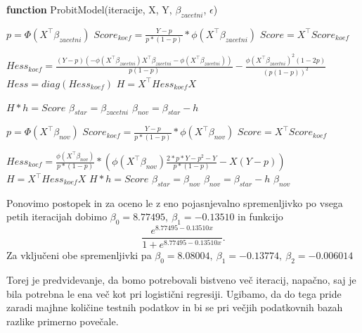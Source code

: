 \documentclass[12pt,a4paper]{amsart}
\theoremstyle{definition} %
\theoremstyle{plain} %
\begin{document}
\begin{algorithm}[H]
    \caption{\textbf{function} ProbitModel(iteracije, X, Y, $\beta_{zacetni}$, $\epsilon$)}
\begin{algorithmic}

    \STATE $p = \Phi(X^\top \beta_{zacetni})$
    \STATE $Score_{koef} = \frac{Y-p}{p*(1-p)} * \phi(X^\top \beta_{zacetni})$
    \STATE $Score = X^\top Score_{koef}$

    \STATE $Hess_{koef} =\frac{(Y-p)(-\phi(X^\top \beta_{zacetni})X^\top \beta_{zacetni} - \phi(X^\top \beta_{zacetni}))}{p(1-p)} - \frac{\phi(X^\top \beta_{zacetni})^2(1-2p)}{(p(1-p))^2}$
    \STATE $Hess = diag(Hess_{koef})$
    \STATE $H = X^\top Hess_{koef} X$
        
    \STATE {} $H * h = Score$
    \STATE $\beta_{star} = \beta_{zacetni}$
    \STATE $\beta_{nov} = \beta_{star} - h$
        
            \STATE $p = \Phi(X^\top \beta_{nov})$
            \STATE $Score_{koef} = \frac{Y-p}{p*(1-p)} * \phi(X^\top \beta_{nov})$
            \STATE $Score = X^\top Score_{koef}$
            
            \STATE $Hess_{koef} = \frac{\phi(X^\top \beta_{nov})}{p*(1-p)} * \left(\phi(X^\top \beta_{nov})\frac{2*p*Y - p^2-Y}{p*(1-p)} - X(Y - p)\right)$
            \STATE $H = X^\top Hess_{koef} X$
            \STATE {}
            \STATE $H * h = Score$ 
            \STATE $\beta_{star} = \beta_{nov}$ 
            \STATE $\beta_{nov} = \beta_{star} - h$ 
        \ELSE
        \STATE {}
        \RETURN $\beta_{nov}$
        \ENDIF
        
    \ENDWHILE
\end{algorithmic}
\end{algorithm}
Ponovimo postopek in za oceno le z eno pojasnjevalno spremenljivko po vsega petih iteracijah dobimo $\beta_{0} = 8.77495,~\beta_{1} = -0.13510$ in funkcijo
\[
    \frac{e^{8.77495-0.13510x}}{1+e^{8.77495-0.13510x}}.
\]
Za vključeni obe spremenljivki pa $\beta_{0} = 8.08004,~\beta_{1} = -0.13774,~\beta_{2} = -0.006014$

Torej je predvidevanje, da bomo potrebovali bistveno več iteracij, napačno, saj je bila potrebna le ena več kot pri logistični regresiji. Ugibamo, da do tega pride zaradi
majhne količine testnih podatkov in bi se pri večjih podatkovnih bazah razlike primerno povečale.
\end{document}
